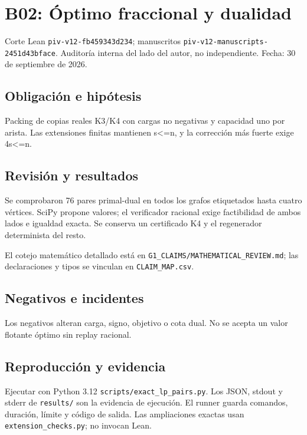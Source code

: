\documentclass[11pt]{article}
\begin{document}
\section{B02: Óptimo fraccional y
dualidad}\label{b02-uxf3ptimo-fraccional-y-dualidad}

Corte Lean \nolinkurl{piv-v12-fb459343d234}; manuscritos
\nolinkurl{piv-v12-manuscripts-2451d43bface}. Auditoría interna del lado
del autor, no independiente. Fecha: 30 de septiembre de 2026.

\subsection{Obligación e hipótesis}\label{obligaciuxf3n-e-hipuxf3tesis}

Packing de copias reales K3/K4 con cargas no negativas y capacidad uno
por arista. Las extensiones finitas mantienen s\textless=n, y la
corrección más fuerte exige 4s\textless=n.

\subsection{Revisión y resultados}\label{revisiuxf3n-y-resultados}

Se comprobaron 76 pares primal-dual en todos los grafos etiquetados
hasta cuatro vértices. SciPy propone valores; el verificador racional
exige factibilidad de ambos lados e igualdad exacta. Se conserva un
certificado K4 y el regenerador determinista del resto.

El cotejo matemático detallado está en
\nolinkurl{G1_CLAIMS/MATHEMATICAL_REVIEW.md}; las declaraciones y tipos
se vinculan en \nolinkurl{CLAIM_MAP.csv}.

\subsection{Negativos e incidentes}\label{negativos-e-incidentes}

Los negativos alteran carga, signo, objetivo o cota dual. No se acepta
un valor flotante óptimo sin replay racional.

\subsection{Reproducción y evidencia}\label{reproducciuxf3n-y-evidencia}

Ejecutar con Python 3.12 \nolinkurl{scripts/exact_lp_pairs.py}. Los JSON,
stdout y stderr de \nolinkurl{results/} son la evidencia de ejecución. El
runner guarda comandos, duración, límite y código de salida. Las
ampliaciones exactas usan \nolinkurl{extension_checks.py}; no invocan
Lean.
\end{document}
